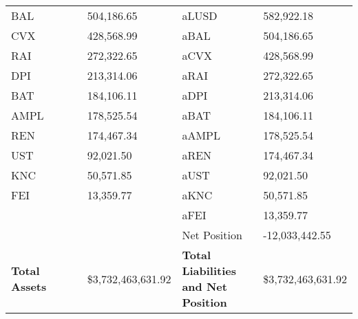 \begin{longtable}{@{}p{0.25\linewidth}p{0.25\linewidth}p{0.25\linewidth}p{0.25\linewidth}@{}}
BAL & 504,186.65 & aLUSD & 582,922.18 \\
CVX & 428,568.99 & aBAL & 504,186.65 \\
RAI & 272,322.65 & aCVX & 428,568.99 \\
DPI & 213,314.06 & aRAI & 272,322.65 \\
BAT & 184,106.11 & aDPI & 213,314.06 \\
AMPL & 178,525.54 & aBAT & 184,106.11 \\
REN & 174,467.34 & aAMPL & 178,525.54 \\
UST & 92,021.50 & aREN & 174,467.34 \\
KNC & 50,571.85 & aUST & 92,021.50 \\
FEI & 13,359.77 & aKNC & 50,571.85 \\
 &  & aFEI & 13,359.77 \\
 &  & Net Position & -12,033,442.55 \\

\midrule

\textbf{Total Assets} & \$3,732,463,631.92 & \textbf{Total Liabilities and Net Position} & \$3,732,463,631.92 \\

\bottomrule

\end{longtable}
